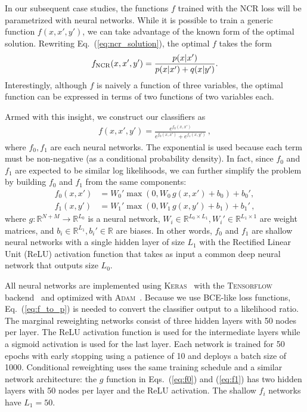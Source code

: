 \documentclass[aps,prx,reprint,preprintnumbers,superscriptaddress,nofootinbib,longbibliography,floatfix]{revtex4-2}
\DeclareRobustCommand{\Eq}[1]{Eq.~(\ref{eq:#1})}
\DeclareRobustCommand{\Eqs}[2]{Eqs.~(\ref{eq:#1}) and (\ref{eq:#2})}
\begin{document}
In our subsequent case studies, the functions $f$ trained with the NCR loss will be parametrized with neural networks.
%
While it is possible to train a generic function $f(x,x',y')$, we can take advantage of the known form of the optimal solution.
%
Rewriting \Eq{ncr_solution}, the optimal $f$ takes the form
%
\begin{equation}
    f_{\rm NCR}(x,x',y') = \frac{p(x|x')}{p(x|x')+q(x|y')}.
\end{equation}
%
Interestingly, although $f$ is naively a function of three variables, the optimal function can be expressed in terms of two functions of two variables each.

Armed with this insight, we construct our classifiers as
%
\begin{align}
\label{eq:condtwofuncs}
    f(x,x',y') = \frac{e^{f_0(x,x')}}{e^{f_0(x,x')}+e^{f_1(x,y')}}\,,
\end{align}
%
where $f_0,f_1$ are each neural networks.
%
The exponential is used because each term must be non-negative (as a conditional probability density).
%
In fact, since $f_0$ and $f_1$ are expected to be similar log likelihoods, we can further simplify the problem by building $f_0$ and $f_1$ from the same components:
%
\begin{align}\label{eq:f0}
    f_0(x,x')&=W_0'\max(0,W_0 \, g(x,x') + b_0)+b_0',\\\label{eq:f1}
    f_1(x,y')&=W_1'\max(0,W_1 \, g(x,y') + b_1)+b_1'\,,
\end{align}
%
where $g:\mathbb{R}^{N+M}\rightarrow\mathbb{R}^{L_0}$ is a neural network, $W_i\in\mathbb{R}^{L_0\times L_1}, W_i'\in\mathbb{R}^{L_1\times 1}$ are weight matrices, and $b_i\in\mathbb{R}^{L_1},b_i'\in\mathbb{R}$ are biases.
%
In other words, $f_0$ and $f_1$ are shallow neural networks with a single hidden layer of size $L_1$ with the Rectified Linear Unit (ReLU) activation function that takes as input a common deep neural network that outputs size $L_0$.



All neural networks are implemented using \textsc{Keras}~\cite{keras} with the \textsc{Tensorflow} backend~\cite{tensorflow} and optimized with \textsc{Adam}~\cite{adam}.
%
Because we use BCE-like loss functions, \Eq{f_to_p} is needed to convert the classifier output to a likelihood ratio.
%
The marginal reweighting networks consist of three hidden layers with 50 nodes per layer.
%
The ReLU activation function is used for the intermediate layers while a sigmoid activation is used for the last layer.
%
Each network is trained for 50 epochs with early stopping using a patience of 10 and deploys a batch size of 1000.
%
Conditional reweighting uses the same training schedule and a similar network architecture: the $g$ function in \Eqs{f0}{f1} has two hidden layers with 50 nodes per layer and the ReLU activation.
%
The shallow $f_i$ networks have $L_1=50$.
\end{document}
